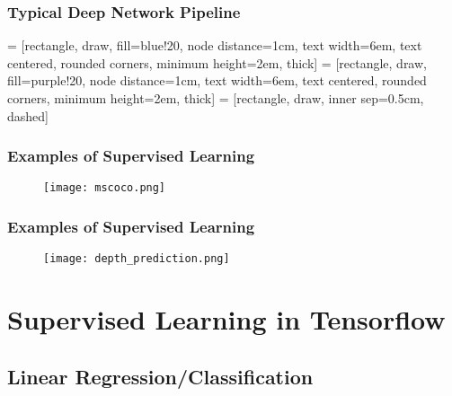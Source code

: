 \documentclass{beamer}
\begin{document}
\begin{frame}
  \frametitle{Typical Deep Network Pipeline}
   = [rectangle, draw, fill=blue!20, node distance=1cm, text width=6em, text centered, rounded corners, minimum height=2em, thick]
   = [rectangle, draw, fill=purple!20, node distance=1cm, text width=6em, text centered, rounded corners, minimum height=2em, thick]
   = [rectangle, draw, inner sep=0.5cm, dashed]

\end{frame}

\begin{frame}
  \frametitle{Examples of Supervised Learning}
  \begin{figure}
    \texttt{[image: mscoco.png]}
  \end{figure}
\end{frame}

\begin{frame}
  \frametitle{Examples of Supervised Learning}
  \begin{figure}
    \texttt{[image: depth\_prediction.png]}
  \end{figure}
\end{frame}



\section{Supervised Learning in Tensorflow}
\subsection{Linear Regression/Classification}
\end{document}
